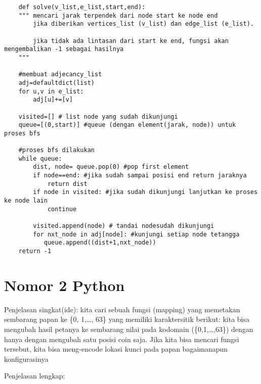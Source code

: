 \documentclass[12pt,letterpaper]{article}
\begin{document}
\break 
\begin{lstlisting}
    def solve(v_list,e_list,start,end):
    """ mencari jarak terpendek dari node start ke node end
        jika diberikan vertices_list (v_list) dan edge_list (e_list).

        jika tidak ada lintasan dari start ke end, fungsi akan mengembalikan -1 sebagai hasilnya
    """

    #membuat adjecancy_list
    adj=defaultdict(list)
    for u,v in e_list:
        adj[u]+=[v]

    visited=[] # list node yang sudah dikunjungi
    queue=[(0,start)] #queue (dengan element(jarak, node)) untuk proses bfs

    #proses bfs dilakukan
    while queue:
        dist, node= queue.pop(0) #pop first element
        if node==end: #jika sudah sampai posisi end return jaraknya
            return dist
        if node in visited: #jika sudah dikunjungi lanjutkan ke proses ke node lain
            continue

        visited.append(node) # tandai nodesudah dikunjungi
        for nxt_node in adj[node]: #kunjungi setiap node tetangga
           queue.append((dist+1,nxt_node))
    return -1

\end{lstlisting}

\break

\section{Nomor 2 Python}
 Penjelasan singkat(ide): kita cari sebuah fungsi (mapping) yang memetakan sembarang papan ke \{0, 1,\dots, 63\}
 yang memiliki karaktersitik berikut: kita bisa mengubah hasil petanya ke sembarang nilai pada kodomain (\{0,1,\dots,63\}) dengan hanya dengan mengubah satu posisi coin saja.
 Jika kita bisa mencari fungsi tersebut, kita bisa meng-encode lokasi kunci pada papan bagaimanapun konfigurasinya 

 \vline

Penjelasan lengkap:
\end{document}
